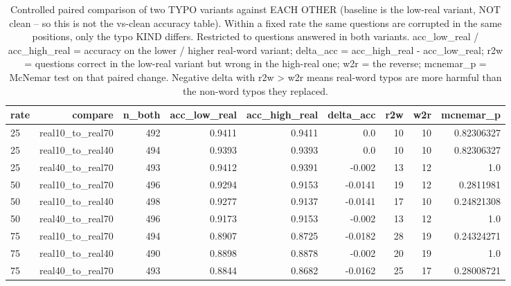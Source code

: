 \documentclass[11pt]{article}
\begin{document}
\begin{table}[H]
\centering
\caption{Controlled paired comparison of two TYPO variants against EACH OTHER (baseline is the low-real variant, NOT clean -- so this is not the vs-clean accuracy table). Within a fixed rate the same questions are corrupted in the same positions, only the typo KIND differs. Restricted to questions answered in both variants. acc\_low\_real / acc\_high\_real = accuracy on the lower / higher real-word variant; delta\_acc = acc\_high\_real - acc\_low\_real; r2w = questions correct in the low-real variant but wrong in the high-real one; w2r = the reverse; mcnemar\_p = McNemar test on that paired change. Negative delta with r2w > w2r means real-word typos are more harmful than the non-word typos they replaced.}
\small
\begin{adjustbox}{max width=\textwidth}
\begin{tabular}{lrrrrrrrr}
\toprule
\textbf{rate} & \textbf{compare} & \textbf{n\_both} & \textbf{acc\_low\_real} & \textbf{acc\_high\_real} & \textbf{delta\_acc} & \textbf{r2w} & \textbf{w2r} & \textbf{mcnemar\_p} \\
\midrule
25 & real10\_to\_real70 & 492 & 0.9411 & 0.9411 & 0.0 & 10 & 10 & 0.82306327 \\
25 & real10\_to\_real40 & 494 & 0.9393 & 0.9393 & 0.0 & 10 & 10 & 0.82306327 \\
25 & real40\_to\_real70 & 493 & 0.9412 & 0.9391 & -0.002 & 13 & 12 & 1.0 \\
50 & real10\_to\_real70 & 496 & 0.9294 & 0.9153 & -0.0141 & 19 & 12 & 0.2811981 \\
50 & real10\_to\_real40 & 498 & 0.9277 & 0.9137 & -0.0141 & 17 & 10 & 0.24821308 \\
50 & real40\_to\_real70 & 496 & 0.9173 & 0.9153 & -0.002 & 13 & 12 & 1.0 \\
75 & real10\_to\_real70 & 494 & 0.8907 & 0.8725 & -0.0182 & 28 & 19 & 0.24324271 \\
75 & real10\_to\_real40 & 490 & 0.8898 & 0.8878 & -0.002 & 20 & 19 & 1.0 \\
75 & real40\_to\_real70 & 493 & 0.8844 & 0.8682 & -0.0162 & 25 & 17 & 0.28008721 \\
\bottomrule
\end{tabular}
\end{adjustbox}
\end{table}
\end{document}
